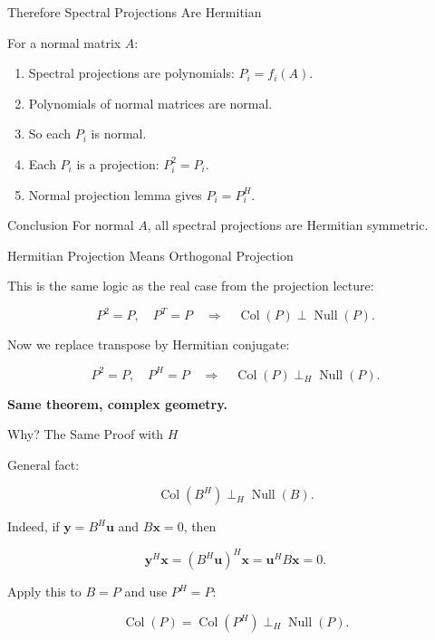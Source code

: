\documentclass[10pt]{beamer}
\theoremstyle{definition}
\newcommand{\x}[1]{\alert{\textbf{#1}}}
\begin{document}
\begin{frame}{Therefore Spectral Projections Are Hermitian}

For a normal matrix $A$:

\vfill

\begin{enumerate}
\item Spectral projections are polynomials: $P_i=f_i(A)$.
\item Polynomials of normal matrices are normal.
\item So each $P_i$ is normal.
\item Each $P_i$ is a projection: $P_i^2=P_i$.
\item Normal projection lemma gives $P_i=P_i^H$.
\end{enumerate}

\vfill

\begin{block}{Conclusion}
For normal $A$, all spectral projections are Hermitian symmetric.
\end{block}

\end{frame}


\begin{frame}{Hermitian Projection Means Orthogonal Projection}

This is the same logic as the real case from the projection lecture:

$$
P^2=P,\quad P^T=P
\quad\Longrightarrow\quad
\operatorname{Col}(P)\perp\operatorname{Null}(P).
$$

\vfill\pause

Now we replace transpose by Hermitian conjugate:

$$
P^2=P,\quad P^H=P
\quad\Longrightarrow\quad
\operatorname{Col}(P)\perp_H\operatorname{Null}(P).
$$

\vfill

\x{Same theorem, complex geometry.}

\end{frame}


\begin{frame}{Why? The Same Proof with $H$}

General fact:

$$
\operatorname{Col}(B^H)\perp_H\operatorname{Null}(B).
$$

\vfill\pause

Indeed, if $\mathbf{y}=B^H\mathbf{u}$ and $B\mathbf{x}=0$, then

$$
\mathbf{y}^H\mathbf{x}
=(B^H\mathbf{u})^H\mathbf{x}
=\mathbf{u}^HB\mathbf{x}
=0.
$$

\vfill\pause

Apply this to $B=P$ and use $P^H=P$:

$$
\operatorname{Col}(P)=\operatorname{Col}(P^H)\perp_H\operatorname{Null}(P).
$$

\end{frame}
\end{document}
